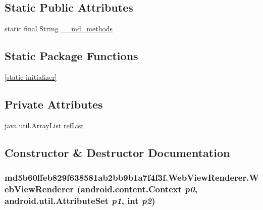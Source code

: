 \subsection*{Static Public Attributes}
\begin{CompactItemize}
\item 
static final String \hyperlink{classmd5b60ffeb829f638581ab2bb9b1a7f4f3f_1_1_web_view_renderer_023fa86f93ecfb325971c3a7204ebc7e}{\_\-\_\-md\_\-methods}
\end{CompactItemize}
\subsection*{Static Package Functions}
\begin{CompactItemize}
\item 
\hyperlink{classmd5b60ffeb829f638581ab2bb9b1a7f4f3f_1_1_web_view_renderer_104d56fcab06d47e41f1c827759281d5}{\mbox{[}static initializer\mbox{]}}
\end{CompactItemize}
\subsection*{Private Attributes}
\begin{CompactItemize}
\item 
java.util.ArrayList \hyperlink{classmd5b60ffeb829f638581ab2bb9b1a7f4f3f_1_1_web_view_renderer_729d3e7508c2fcb66b26f19a378f0efe}{refList}
\end{CompactItemize}


\subsection{Constructor \& Destructor Documentation}
\hypertarget{classmd5b60ffeb829f638581ab2bb9b1a7f4f3f_1_1_web_view_renderer_efd07d6eeb7a2a7eba83ec8f30ddf5a0}{
\subsubsection[{WebViewRenderer}]{\setlength{\rightskip}{0pt plus 5cm}md5b60ffeb829f638581ab2bb9b1a7f4f3f.WebViewRenderer.WebViewRenderer (android.content.Context {\em p0}, \/  android.util.AttributeSet {\em p1}, \/  int {\em p2})}}
\label{classmd5b60ffeb829f638581ab2bb9b1a7f4f3f_1_1_web_view_renderer_efd07d6eeb7a2a7eba83ec8f30ddf5a0}


